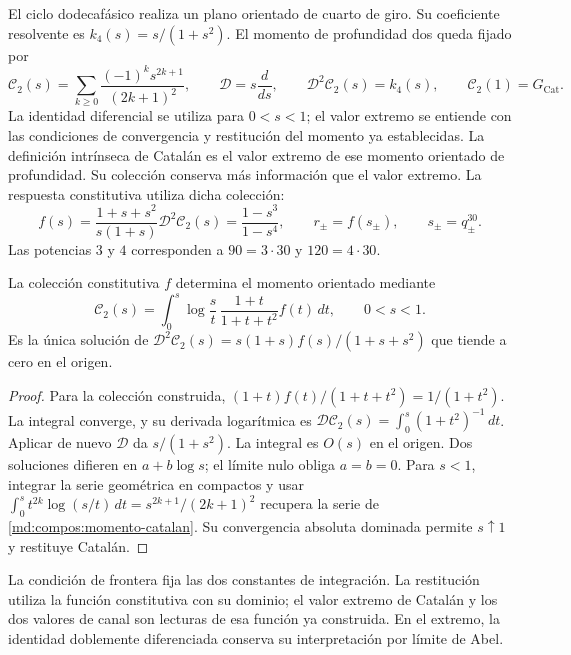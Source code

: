 El ciclo dodecafásico realiza un plano orientado de cuarto de giro. Su
coeficiente resolvente es $k_4(s)=s/(1+s^2)$. El momento de profundidad dos
queda fijado por
\begin{equation}
 \mathcal C_2(s)=\sum_{k\geq0}
 \frac{(-1)^ks^{2k+1}}{(2k+1)^2},\qquad
 \mathcal D=s\frac{d}{ds},\qquad
 \mathcal D^2\mathcal C_2(s)=k_4(s),\qquad
 \mathcal C_2(1)=G_{\mathrm{Cat}}.
 \label{md:compos:momento-catalan}
\end{equation}
La identidad diferencial se utiliza para $0<s<1$; el valor extremo se
entiende con las condiciones de convergencia y restitución del momento ya
establecidas. La definición intrínseca de Catalán es el valor extremo de ese
momento orientado de profundidad. Su colección conserva más información que
el valor extremo. La respuesta constitutiva utiliza dicha colección:
\begin{equation}
 f(s)=\frac{1+s+s^2}{s(1+s)}\mathcal D^2\mathcal C_2(s)
 =\frac{1-s^3}{1-s^4},\qquad
 r_\pm=f(s_\pm),\qquad s_\pm=q_\pm^{30}.
 \label{md:compos:catalan-respuesta}
\end{equation}
Las potencias $3$ y $4$ corresponden a $90=3\cdot30$ y $120=4\cdot30$.
\begin{proposition}
\label{md:compos:inversa-catalan}
La colección constitutiva $f$ determina el momento orientado mediante
\[
 \mathcal C_2(s)=\int_0^s\log\frac{s}{t}\,
 \frac{1+t}{1+t+t^2}f(t)\,dt,\qquad 0<s<1.
\]
Es la única solución de
$\mathcal D^2\mathcal C_2(s)=s(1+s)f(s)/(1+s+s^2)$
que tiende a cero en el origen.
\end{proposition}
\begin{proof}
Para la colección construida,
$(1+t)f(t)/(1+t+t^2)=1/(1+t^2)$. La integral converge, y su
derivada logarítmica es
$\mathcal D\mathcal C_2(s)=\int_0^s(1+t^2)^{-1}\,dt$.
Aplicar de nuevo $\mathcal D$ da $s/(1+s^2)$. La integral es
$O(s)$ en el origen. Dos soluciones difieren en $a+b\log s$;
el límite nulo obliga $a=b=0$.
Para $s<1$, integrar la serie geométrica en compactos y usar
$\int_0^s t^{2k}\log(s/t)\,dt=s^{2k+1}/(2k+1)^2$
recupera la serie de \eqref{md:compos:momento-catalan}.
Su convergencia absoluta dominada permite $s\uparrow1$ y restituye Catalán.
\end{proof}
La condición de frontera fija las dos constantes de integración.
La restitución utiliza la función constitutiva con su dominio; el
valor extremo de Catalán y los dos valores de canal son lecturas de
esa función ya construida. En el extremo, la identidad doblemente
diferenciada conserva su interpretación por límite de Abel.


